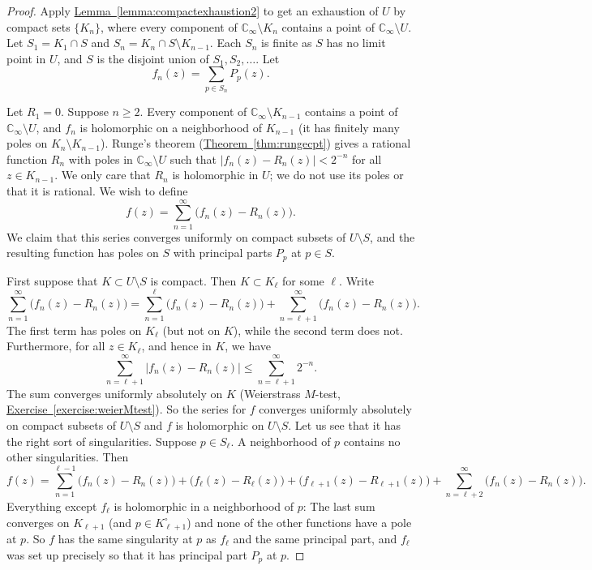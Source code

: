 \documentclass[12pt,openany]{book}
\newcommand{\sabs}[1]{\lvert {#1} \rvert}
\newcommand{\abs}[1]{\left\lvert {#1} \right\rvert}
\newcommand{\C}{{\mathbb{C}}}
\theoremstyle{plain}
\theoremstyle{remark}
\theoremstyle{definition}
\theoremstyle{exercise}
\theoremstyle{example}
\newcommand{\exerciseref}[1]{\hyperref[#1]{Exercise~\ref*{#1}}}
\newcommand{\thmref}[1]{\hyperref[#1]{Theorem~\ref*{#1}}}
\newcommand{\lemmaref}[1]{\hyperref[#1]{Lemma~\ref*{#1}}}
\begin{document}
\begin{proof}
Apply \lemmaref{lemma:compactexhaustion2} to get an exhaustion
of $U$ by compact sets $\{ K_n \}$,
where every component of $\C_\infty \setminus K_{n}$
contains a point of $\C_\infty \setminus U$.
Let $S_1 = K_1 \cap S$ and
$S_n = K_n \cap S \setminus K_{n-1}$.
Each $S_n$ is finite as $S$ has no limit point in $U$,
and $S$ is the disjoint union of $S_1,S_2,\ldots$.
Let
\begin{equation*}
f_n(z) = \sum_{p \in S_n} P_p(z) .
\end{equation*}

Let $R_1=0$.  Suppose $n \geq 2$.
Every component of $\C_\infty \setminus K_{n-1}$ contains a point of
$\C_\infty \setminus U$, and $f_n$ is holomorphic on a neighborhood of
$K_{n-1}$ (it has finitely many poles on $K_n \setminus K_{n-1}$).
Runge's theorem
(\thmref{thm:rungecpt})
gives a rational function $R_n$ with poles in 
$\C_\infty \setminus U$ such that $\sabs{f_n(z)-R_n(z)} < 2^{-n}$
for all $z \in K_{n-1}$.  We only care that $R_n$ is holomorphic in $U$; we
do not use its poles or that it is rational.
We wish to define
\begin{equation*}
f(z) = \sum_{n=1}^\infty \bigl( f_n(z) - R_n(z) \bigr) .
\end{equation*}
We claim that this series converges uniformly on compact subsets of $U \setminus S$,
and the resulting function has poles on $S$
with principal parts $P_p$ at $p \in S$.

First suppose that $K \subset U \setminus S$ is compact.  Then $K \subset
K_\ell$ for some $\ell$.  Write
\begin{equation*}
\sum_{n=1}^\infty \bigl( f_n(z) - R_n(z) \bigr)
=
\sum_{n=1}^{\ell} \bigl( f_n(z) - R_n(z) \bigr)
+
\sum_{n=\ell+1}^\infty \bigl( f_n(z) - R_n(z) \bigr) .
\end{equation*}
The first term has poles on $K_\ell$ (but not on $K$),
while the second term does not.  Furthermore, for all $z \in K_\ell$, and
hence in $K$, we have
\begin{equation*}
\sum_{n=\ell+1}^\infty \abs{ f_n(z) - R_n(z) }
\leq
\sum_{n=\ell+1}^\infty 2^{-n} .
\end{equation*}
The sum converges uniformly absolutely on $K$ (Weierstrass $M$-test,
\exerciseref{exercise:weierMtest}).
So the series for $f$ converges uniformly absolutely
on compact subsets of $U \setminus S$ and $f$ is holomorphic on $U
\setminus S$.  Let us see that it has the right sort of singularities.
Suppose $p \in S_\ell$.  A neighborhood of $p$ contains no other
singularities.  Then
\begin{equation*}
f(z) = 
\sum_{n=1}^{\ell-1} \bigl( f_n(z) - R_n(z) \bigr)
+
\bigl( f_\ell(z) - R_\ell(z) \bigr)
+
\bigl( f_{\ell+1}(z) - R_{\ell+1}(z) \bigr)
+
\sum_{n=\ell+2}^\infty \bigl( f_n(z) - R_n(z) \bigr) .
\end{equation*}
Everything except $f_\ell$ is holomorphic in a neighborhood of $p$:
The last sum converges on $K_{\ell+1}$ (and $p \in K_{\ell+1}^{\circ}$)
and none of the other functions have
a pole at $p$.
So $f$ has the same singularity at $p$ as $f_\ell$ and the same principal
part, and $f_\ell$ was set up precisely so that it has principal part
$P_p$ at $p$.
\end{proof}
\end{document}
